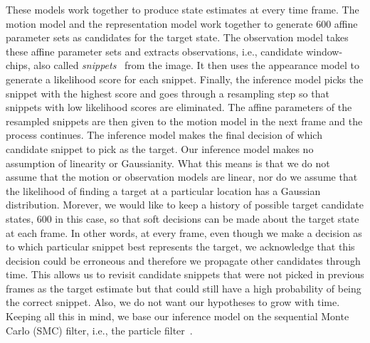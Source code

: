 \documentclass{article}
\begin{document}
These models work together to produce state estimates at every time frame.  The motion model and the representation model work together to generate 600 affine parameter sets as candidates for the target state.  The observation model takes these affine parameter sets and extracts observations, i.e., candidate window-chips, also called \emph{snippets}~\cite{2007_JNL_IDDM_Barnes} from the image.  It then uses the appearance model to generate a likelihood score for each snippet.  Finally, the inference model picks the snippet with the highest score and goes through a resampling step so that snippets with low likelihood scores are eliminated.  The affine parameters of the resampled snippets are then given to the motion model in the next frame and the process continues.  The inference model makes the final decision of which candidate snippet to pick as the target.  Our inference model makes no assumption of linearity or Gaussianity.  What this means is that we do not assume that the motion or observation models are linear, nor do we assume that the likelihood of finding a target at a particular location has a Gaussian distribution.  Morever, we would like to keep a history of possible target candidate states, 600 in this case, so that soft decisions can be made about the target state at each frame.  In other words, at every frame, even though we make a decision as to which particular snippet best represents the target, we acknowledge that this decision could be erroneous and therefore we propagate other candidates through time.  This allows us to revisit candidate snippets that were not picked in previous frames as the target estimate but that could still have a high probability of being the correct snippet.  Also, we do not want our hypotheses to grow with time.  Keeping all this in mind, we base our inference model on the sequential Monte Carlo (SMC) filter, i.e., the particle filter~\cite{2002_JNL_PF_Arulampalam}.  

\end{document}
